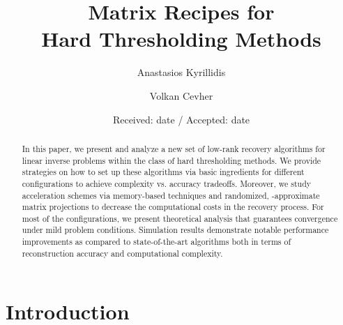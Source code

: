 \documentclass[twocolumn]{svjour3}
\author{\IEEEauthorblockN{Anastasios Kyrillidis \and Volkan Cevher \\}}
\begin{document}
\title{Matrix Recipes for \\ Hard Thresholding Methods}

\author{Anastasios Kyrillidis \and Volkan Cevher}


\date{Received: date / Accepted: date}

\maketitle

\begin{abstract}
In this paper, we present and analyze a new set of low-rank recovery algorithms for linear inverse problems within the class of hard thresholding methods. We provide strategies on how to set up these algorithms via basic ingredients for different configurations to achieve complexity vs. accuracy tradeoffs. Moreover, we study acceleration schemes via memory-based techniques and randomized, -approximate matrix projections to decrease the computational costs in the recovery process. For most of the configurations, we present theoretical analysis that guarantees convergence under mild problem conditions.  Simulation results demonstrate notable performance improvements as compared to state-of-the-art algorithms both in terms of reconstruction accuracy and computational complexity.

\end{abstract}

\section{Introduction}
\end{document}
